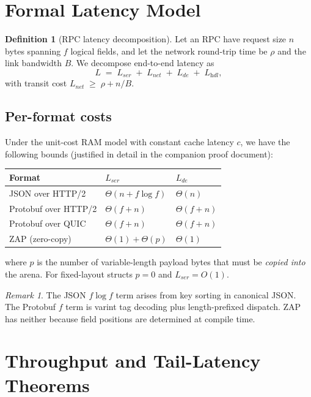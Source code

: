 \documentclass[11pt]{article}
\theoremstyle{definition}
\newtheorem{definition}[theorem]{Definition}
\theoremstyle{remark}
\newtheorem*{remark}{Remark}
\begin{document}
\section{Formal Latency Model}
\label{sec:model}

\begin{definition}[RPC latency decomposition]
Let an RPC have request size $n$ bytes spanning $f$ logical fields,
and let the network round-trip time be $\rho$ and the link bandwidth
$B$. We decompose end-to-end latency as
\[
  L \;=\; L_{\textit{ser}} \;+\; L_{\textit{net}} \;+\; L_{\textit{de}} \;+\; L_{\textit{hdl}},
\]
with transit cost $L_{\textit{net}} \;\geq\; \rho + n/B$.
\end{definition}

\subsection{Per-format costs}
Under the unit-cost RAM model with constant cache latency $c$, we have
the following bounds (justified in detail in the companion proof
document):

\begin{center}
\begin{tabular}{lll}
\toprule
Format & $L_{\textit{ser}}$ & $L_{\textit{de}}$ \\
\midrule
JSON over HTTP/2          & $\Theta(n + f \log f)$ & $\Theta(n)$ \\
Protobuf over HTTP/2      & $\Theta(f + n)$         & $\Theta(f + n)$ \\
Protobuf over QUIC        & $\Theta(f + n)$         & $\Theta(f + n)$ \\
ZAP (zero-copy)           & $\Theta(1) + \Theta(p)$ & $\Theta(1)$ \\
\bottomrule
\end{tabular}
\end{center}

\noindent
where $p$ is the number of variable-length payload bytes that must be
\emph{copied into} the arena. For fixed-layout structs $p=0$ and
$L_{\textit{ser}}=O(1)$.

\begin{remark}
The JSON $f \log f$ term arises from key sorting in canonical
JSON. The Protobuf $f$ term is varint tag decoding plus
length-prefixed dispatch. ZAP has neither because field positions are
determined at compile time.
\end{remark}

\section{Throughput and Tail-Latency Theorems}
\label{sec:theorems}
\end{document}
